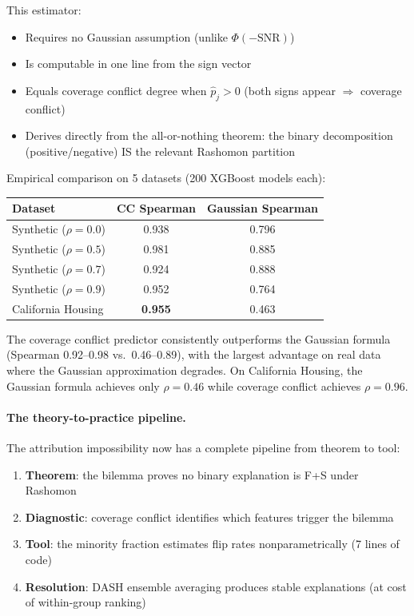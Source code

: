 \documentclass{article}
\begin{document}
This estimator:
\begin{itemize}
  \item Requires no Gaussian assumption (unlike $\Phi(-\text{SNR})$)
  \item Is computable in one line from the sign vector
  \item Equals coverage conflict degree when $\hat{p}_j > 0$ (both signs appear $\Rightarrow$ coverage conflict)
  \item Derives directly from the all-or-nothing theorem: the binary decomposition (positive/negative) IS the relevant Rashomon partition
\end{itemize}

Empirical comparison on 5 datasets (200 XGBoost models each):

\begin{center}
\small
\begin{tabular}{lcc}
\toprule
Dataset & CC Spearman & Gaussian Spearman \\
\midrule
Synthetic ($\rho = 0.0$) & 0.938 & 0.796 \\
Synthetic ($\rho = 0.5$) & 0.981 & 0.885 \\
Synthetic ($\rho = 0.7$) & 0.924 & 0.888 \\
Synthetic ($\rho = 0.9$) & 0.952 & 0.764 \\
California Housing & \textbf{0.955} & 0.463 \\
\bottomrule
\end{tabular}
\end{center}

The coverage conflict predictor consistently outperforms the Gaussian formula (Spearman 0.92--0.98 vs.\ 0.46--0.89), with the largest advantage on real data where the Gaussian approximation degrades. On California Housing, the Gaussian formula achieves only $\rho = 0.46$ while coverage conflict achieves $\rho = 0.96$.

\paragraph{The theory-to-practice pipeline.}
The attribution impossibility now has a complete pipeline from theorem to tool:
\begin{enumerate}
  \item \textbf{Theorem}: the bilemma proves no binary explanation is F+S under Rashomon
  \item \textbf{Diagnostic}: coverage conflict identifies which features trigger the bilemma
  \item \textbf{Tool}: the minority fraction estimates flip rates nonparametrically (7 lines of code)
  \item \textbf{Resolution}: DASH ensemble averaging produces stable explanations (at cost of within-group ranking)
\end{enumerate}
\end{document}
